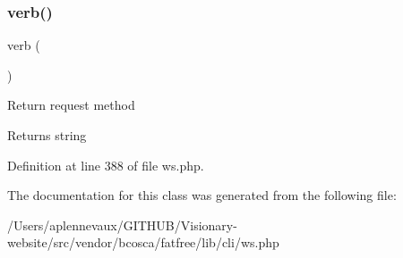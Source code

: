 \subsubsection{\texorpdfstring{verb()}{verb()}}
{\footnotesize\ttfamily verb (\begin{DoxyParamCaption}{ }\end{DoxyParamCaption})}

Return request method \begin{DoxyReturn}{Returns}
string 
\end{DoxyReturn}


Definition at line 388 of file ws.\+php.



The documentation for this class was generated from the following file\+:\begin{DoxyCompactItemize}
\item 
/\+Users/aplennevaux/\+G\+I\+T\+H\+U\+B/\+Visionary-\/website/src/vendor/bcosca/fatfree/lib/cli/ws.\+php\end{DoxyCompactItemize}
